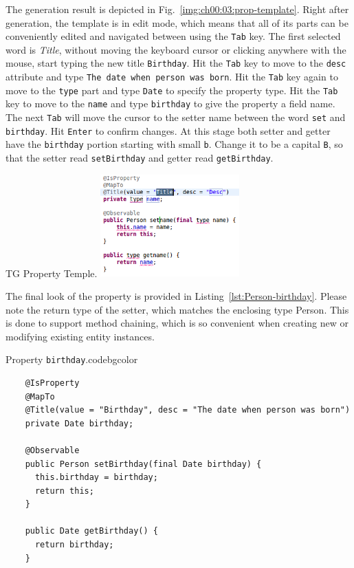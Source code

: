   The generation result is depicted in Fig.~\ref{img:ch00:03:prop-template}.
  Right after generation, the template is in edit mode, which means that all of its parts can be conveniently edited and navigated between using the \texttt{Tab} key.
  The first selected word is \emph{Title}, without moving the keyboard cursor or clicking anywhere with the mouse, start typing the new title \texttt{Birthday}.
  Hit the \texttt{Tab} key to move to the \texttt{desc} attribute and type \texttt{The date when person was born}.
  Hit the \texttt{Tab} key again to move to the \texttt{type} part and type \texttt{Date} to specify the property type.
  Hit the \texttt{Tab} key to move to the \texttt{name} and type \texttt{birthday} to give the property a field name.
  The next \texttt{Tab} will move the cursor to the setter name between the word \texttt{set} and \texttt{birthday}.
  Hit \texttt{Enter} to confirm changes.
  At this stage both setter and getter have the \texttt{birthday} portion starting with small \texttt{b}.
  Change it to be a capital \texttt{B}, so that the setter read \texttt{setBirthday} and getter read \texttt{getBirthday}.

  \begin{image}{TG Property Temple.}{\label{img:ch00:03:prop-template}}
    \includegraphics[width=0.4\textwidth]{parts/00-part/chapters/02-making-changes/images/03-birthday-property-template.png}
  \end{image}

  The final look of the property is provided in Listing~\ref{lst:Person-birthday}.
  Please note the return type of the setter, which matches the enclosing type Person.
  This is done to support method chaining, which is so convenient when creating new or modifying existing entity instances.

  \begin{code}{Property \texttt{birthday}.}{\label{lst:Person-birthday}}{codebgcolor}
    \begin{lstlisting}
    @IsProperty
    @MapTo
    @Title(value = "Birthday", desc = "The date when person was born")
    private Date birthday;
    
    @Observable
    public Person setBirthday(final Date birthday) {
      this.birthday = birthday;
      return this;
    }
    
    public Date getBirthday() {
      return birthday;
    }
    \end{lstlisting}
  \end{code}

